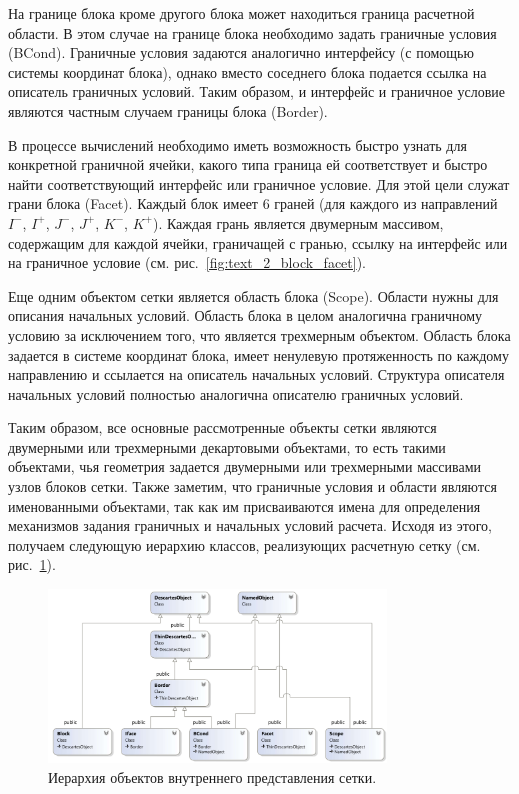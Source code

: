 На границе блока кроме другого блока может находиться граница расчетной области.
В этом случае на границе блока необходимо задать граничные условия (BCond).
Граничные условия задаются аналогично интерфейсу (с помощью системы координат блока), однако вместо соседнего блока подается ссылка на описатель граничных условий.
Таким образом, и интерфейс и граничное условие являются частным случаем границы блока (Border).

В процессе вычислений необходимо иметь возможность быстро узнать для конкретной граничной ячейки, какого типа граница ей соответствует и быстро найти соответствующий интерфейс или граничное условие.
Для этой цели служат грани блока (Facet).
Каждый блок имеет 6 граней (для каждого из направлений $I^{-}$, $I^{+}$, $J^{-}$, $J^{+}$, $K^{-}$, $K^{+}$).
Каждая грань является двумерным массивом, содержащим для каждой ячейки, граничащей с гранью, ссылку на интерфейс или на граничное условие (см. рис.~\ref{fig:text_2_block_facet}).

Еще одним объектом сетки является область блока (Scope).
Области нужны для описания начальных условий.
Область блока в целом аналогична граничному условию за исключением того, что является трехмерным объектом.
Область блока задается в системе координат блока, имеет ненулевую протяженность по каждому направлению и ссылается на описатель начальных условий.
Структура описателя начальных условий полностью аналогична описателю граничных условий.

Таким образом, все основные рассмотренные объекты сетки являются двумерными или трехмерными декартовыми объектами, то есть такими объектами, чья геометрия задается двумерными или трехмерными массивами узлов блоков сетки.
Также заметим, что граничные условия и области являются именованными объектами, так как им присваиваются имена для определения механизмов задания граничных и начальных условий расчета.
Исходя из этого, получаем следующую иерархию классов, реализующих расчетную сетку (см. рис.~\ref{fig:text_2_block_hierarchy}).

\begin{figure}[ht]
\centering
\includegraphics[width=0.8\textwidth]{fig/par_9-hierarchy.png}
\singlespacing
{}\caption{Иерархия объектов внутреннего представления сетки.}
\label{fig:text_2_block_hierarchy}
\end{figure}


